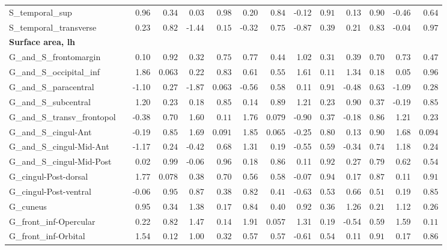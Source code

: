 {\begin{longtable}{llrrrrrrrrrrrr}
S\_temporal\_sup &  & 0.96 & $0.34$ & 0.03 & $0.98$ & 0.20 & $0.84$ & -0.12 & $0.91$ & 0.13 & $0.90$ & -0.46 & $0.64$ \\
S\_temporal\_transverse &  & 0.23 & $0.82$ & -1.44 & $0.15$ & -0.32 & $0.75$ & -0.87 & $0.39$ & 0.21 & $0.83$ & -0.04 & $0.97$ \\
\midrule\multicolumn{14}{l}{\textbf{Surface area, lh}} \\
G\_and\_S\_frontomargin &  & 0.10 & $0.92$ & 0.32 & $0.75$ & 0.77 & $0.44$ & 1.02 & $0.31$ & 0.39 & $0.70$ & 0.73 & $0.47$ \\
G\_and\_S\_occipital\_inf &  & 1.86 & $0.063$ & 0.22 & $0.83$ & 0.61 & $0.55$ & 1.61 & $0.11$ & 1.34 & $0.18$ & 0.05 & $0.96$ \\
G\_and\_S\_paracentral &  & -1.10 & $0.27$ & -1.87 & $0.063$ & -0.56 & $0.58$ & 0.11 & $0.91$ & -0.48 & $0.63$ & -1.09 & $0.28$ \\
G\_and\_S\_subcentral &  & 1.20 & $0.23$ & 0.18 & $0.85$ & 0.14 & $0.89$ & 1.21 & $0.23$ & 0.90 & $0.37$ & -0.19 & $0.85$ \\
G\_and\_S\_transv\_frontopol &  & -0.38 & $0.70$ & 1.60 & $0.11$ & 1.76 & $0.079$ & -0.90 & $0.37$ & -0.18 & $0.86$ & 1.21 & $0.23$ \\
G\_and\_S\_cingul-Ant &  & -0.19 & $0.85$ & 1.69 & $0.091$ & 1.85 & $0.065$ & -0.25 & $0.80$ & 0.13 & $0.90$ & 1.68 & $0.094$ \\
G\_and\_S\_cingul-Mid-Ant &  & -1.17 & $0.24$ & -0.42 & $0.68$ & 1.31 & $0.19$ & -0.55 & $0.59$ & -0.34 & $0.74$ & 1.18 & $0.24$ \\
G\_and\_S\_cingul-Mid-Post &  & 0.02 & $0.99$ & -0.06 & $0.96$ & 0.18 & $0.86$ & 0.11 & $0.92$ & 0.27 & $0.79$ & 0.62 & $0.54$ \\
G\_cingul-Post-dorsal &  & 1.77 & $0.078$ & 0.38 & $0.70$ & 0.56 & $0.58$ & -0.07 & $0.94$ & 0.17 & $0.87$ & 0.11 & $0.91$ \\
G\_cingul-Post-ventral &  & -0.06 & $0.95$ & 0.87 & $0.38$ & 0.82 & $0.41$ & -0.63 & $0.53$ & 0.66 & $0.51$ & 0.19 & $0.85$ \\
G\_cuneus &  & 0.95 & $0.34$ & 1.38 & $0.17$ & 0.84 & $0.40$ & 0.92 & $0.36$ & 1.26 & $0.21$ & 1.12 & $0.26$ \\
G\_front\_inf-Opercular &  & 0.22 & $0.82$ & 1.47 & $0.14$ & 1.91 & $0.057$ & 1.31 & $0.19$ & -0.54 & $0.59$ & 1.59 & $0.11$ \\
G\_front\_inf-Orbital &  & 1.54 & $0.12$ & 1.00 & $0.32$ & 0.57 & $0.57$ & -0.61 & $0.54$ & 0.11 & $0.91$ & 0.17 & $0.86$ \\

\end{longtable}}

